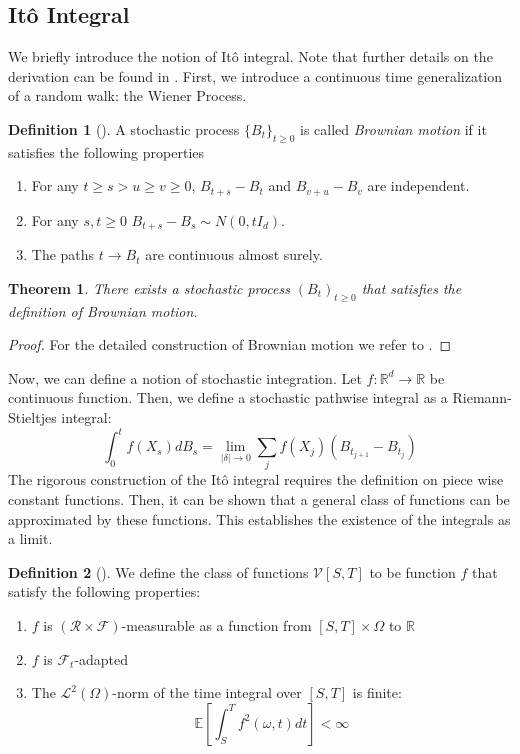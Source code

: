 \documentclass[12pt]{article}
\newtheorem{theorem}{Theorem}[section]
\theoremstyle{definition}
\newtheorem{definition}[definition]{Definition}
\numberwithin{equation}{section}
\newcommand{\R}{\mathbb{R}}
\newcommand{\E}{\mathbb{E}}
\newcommand{\CF}{\mathcal{F}}
\newcommand{\CL}{\mathcal{L}}
\newcommand{\CR}{\mathcal{R}}
\newcommand{\CV}{\mathcal{V}}
\begin{document}
\subsection{Itô Integral}
\label{subsec:ItoIntegral}
We briefly introduce the notion of Itô integral. Note that further details on the derivation can be found in \autocite{eAppliedStochasticAnalysis2021}. 
First, we introduce a continuous time generalization of a random walk: the Wiener Process.
\begin{definition}[\autocite{durrettProbabilityTheoryExamples2019}]
  A stochastic process $\{B_t\}_{t \geq 0}$ is called \emph{Brownian motion} if it satisfies the following properties
  \begin{enumerate}[label=(\roman*)]
    \item For any $t \geq s > u \geq v \geq 0$, $B_{t+s} - B_t$ and $B_{v+u} - B_v$ are independent.
    \item For any $s,t \geq 0$ $B_{t+s} - B_s \sim N(0, tI_d)$.
    \item The paths $t \rightarrow B_t$ are continuous almost surely.
  \end{enumerate}
\end{definition}
\begin{theorem}
  There exists a stochastic process $(B_t)_{t \geq 0}$ that satisfies the definition of Brownian motion.
\end{theorem}
\begin{proof}
  For the detailed construction of Brownian motion we refer to \autocite{durrettProbabilityTheoryExamples2019}.
\end{proof}
Now, we can define a notion of stochastic integration. Let $f : \R^d \rightarrow \R$ be continuous function. Then, we define a stochastic pathwise integral as a Riemann-Stieltjes integral:
\begin{equation*}
  \int_0^t f(X_s) dB_s = \lim\limits_{|\delta| \rightarrow 0} \sum_j f(X_j)(B_{t_{j+1}} - B_{t_j})
\end{equation*}
The rigorous construction of the Itô integral requires the definition on piece wise constant functions. Then, it can be shown that a general class of functions can be approximated by these functions. This establishes the existence of the integrals as a limit.
\begin{definition}[]
  We define the class of functions $\CV[S,T]$ to be function $f$ that satisfy the following properties:
  \begin{enumerate}
    \item $f$ is $(\CR \times \CF)$-measurable as a function from $[S,T] \times \Omega$ to $\R$
    \item $f$ is $\CF_t$-adapted
    \item The $\CL^2(\Omega)$-norm of the time integral over $[S,T]$ is finite:
    \begin{equation*}
      \E \left[ \int_S^T f^2(\omega,t)dt \right] < \infty
    \end{equation*}
  \end{enumerate}
\end{definition}
\end{document}
